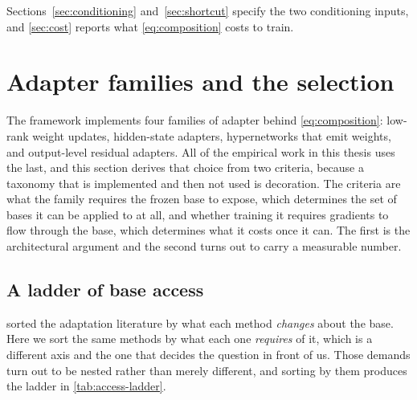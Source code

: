 Sections~\ref{sec:conditioning} and~\ref{sec:shortcut} specify the two
conditioning inputs, and \cref{sec:cost} reports what
\cref{eq:composition} costs to train.

\section{Adapter families and the selection}
\label{sec:families}

The framework implements four families of adapter behind
\cref{eq:composition}: low-rank weight updates, hidden-state adapters,
hypernetworks that emit weights, and output-level residual adapters. All of
the empirical work in this thesis uses the last, and this section derives
that choice from two criteria, because a taxonomy that is implemented and
then not used is decoration. The criteria are what the family requires the
frozen base to expose, which determines the set of bases it can be applied
to at all, and whether training it requires gradients to flow through the
base, which determines what it costs once it can. The first is the
architectural argument and the second turns out to carry a measurable
number.

\subsection{A ladder of base access}
\label{sec:access-ladder}

 sorted the adaptation literature by what each
method \emph{changes} about the base. Here we sort the same methods by what
each one \emph{requires} of it, which is a different axis and the one that
decides the question in front of us. Those demands turn out to be nested
rather than merely different, and sorting by them produces the ladder in
\cref{tab:access-ladder}.

